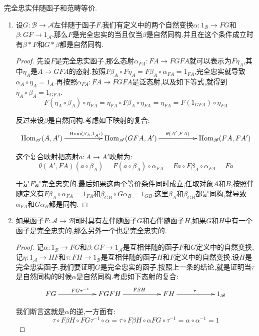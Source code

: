 完全忠实伴随函子和范畴等价.
\begin{enumerate}
	\item 设$G:\mathscr{B}\to\mathscr{A}$左伴随于函子$F$.我们有定义中的两个自然变换$\alpha:1_{\mathscr{B}}\to FG$和$\beta:GF\to 1_{\mathscr{A}}$.那么$F$是完全忠实的当且仅当$\beta$是自然同构.并且在这个条件成立时有$\beta\ast F$和$G\ast\beta$都是自然同构.
	\begin{proof}
		
		先设$F$是完全忠实函子,那么态射$\alpha_{FA}:FA\to FGFA$就可以表示为$F\eta_A$,其中$\eta_A$是$A\to GFA$的态射.按照$F\beta_A\circ F\eta_A=F\beta_A\circ\alpha_{FA}=1_{FA}$,完全忠实就导致$\alpha_A\circ\eta_A=1_A$.再按照$\alpha_{FA}:FA\to FGFA$是泛态射,以及如下等式,就得到$\eta_A\circ\beta_A=1_{GFA}$.
		$$F(\eta_A\circ\beta_A)\circ\eta_{FA}=\eta_{FA}\circ F\beta_A\circ\eta_{FA}=\eta_{FA}=F(1_{GFA})\circ\eta_{FA}$$
		
		反过来设$\beta$是自然同构.考虑如下映射的复合:
		$$\xymatrix{\mathrm{Hom}_{\mathscr{A}}(A,A')\ar[rr]^{\mathrm{Hom}(\beta_A,1_{A'})}&&\mathrm{Hom}_{\mathscr{A}}(GFA,A')\ar[rr]^{\theta(A',FA)}&&\mathrm{Hom}_{\mathscr{B}}(FA,FA')}$$
		
		这个复合映射把态射$a:A\to A'$映射为:
		$$\theta(A',FA)(a\circ\beta_A)=F(a\circ\beta_A)\circ\alpha_{FA}=Fa\circ F\beta_A\circ\alpha_{FA}=Fa$$
		
		于是$F$是完全忠实的.最后如果这两个等价条件同时成立,任取对象$A$和$B$,按照伴随定义有$F\beta_A\circ\alpha_{FA}=1_{FA}$和$\beta_{GB}\circ G\alpha_B=1_{GB}$.这里$\beta_A$和$\beta_{GB}$都是同构,就导致$\alpha_{FA}$和$G\alpha_B$都是同构.
	\end{proof}
    \item 如果函子$F:\mathscr{A}\to\mathscr{B}$同时具有左伴随函子$G$和右伴随函子$H$,如果$G$和$H$中有一个函子是完全忠实的,那么另外一个也是完全忠实的.
    \begin{proof}
    	
    	记$\alpha:1_{\mathscr{B}}\to FG$和$\beta:GF\to1_{\mathscr{A}}$是互相伴随的函子$F$和$G$定义中的自然变换,记$\eta:1_{\mathscr{A}}\to HF$和$\tau:FH\to1_{\mathscr{B}}$是互相伴随的函子$H$和$F$定义中的自然变换.设$H$是完全忠实函子.我们要证明$G$是完全忠实的函子.按照上一条的结论,就是证明当$\tau$是自然同构的时候$\alpha$是自然同构.考虑如下态射的复合:
    	$$\xymatrix{FG\ar[rr]^{FG\tau^{-1}}&&FGFH\ar[rr]^{F\beta H}&&FH\ar[rr]^{\tau}&&1_{\mathscr{B}}}$$
    	
    	我们断言这就是$\alpha$的逆,一方面有:
    	$$\tau\circ F\beta H\circ FG\tau^{-1}\circ\alpha=\tau\circ F\beta H\circ\alpha FG\circ\tau^{-1}=\alpha\circ\alpha^{-1}=1$$
    	

\end{proof}
\end{enumerate}
